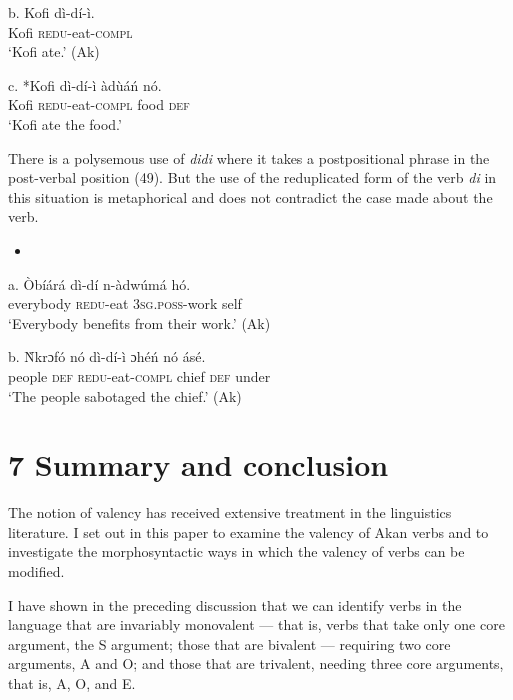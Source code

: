 \documentclass[output=paper]{langsci/langscibook}
\begin{document}
\gll  b.  Kofi  d\`{i}-d\'{i}-\`{i}.\\
       Kofi  \textsc{redu}{}-eat-\textsc{compl}\\
\glt   ‘Kofi ate.’ (Ak)
\z

\gll  c.  *Kofi  d\`{i}-d\'{i}-\`{i}      \`{a}d\`{u}\'{a}\'{n}    n\'{o}.\\
       Kofi  \textsc{redu}{}-eat-\textsc{compl}  food    \textsc{def}\\
\glt   ‘Kofi ate the food.’
\z

There is a polysemous use of \emph{didi} where it takes a postpositional phrase in the post-verbal position (49). But the use of the reduplicated form of the verb \emph{di} in this situation is metaphorical and does not contradict the case made about the verb.

\begin{itemize}
\item \end{itemize}
\gll a.  \`{O}b\'{i}\'{a}r\'{a}    d\`{i}-d\'{i}    n-\`{a}dw\'{u}m\'{a}    h\'{o}.\\
       everybody  \textsc{redu}{}-eat  \textsc{3sg.poss}{}-work  self\\
\glt   ‘Everybody benefits from their work.’ (Ak)
\z

\gll  b.  \`{N}krɔf\'{o}  n\'{o}  d\`{i}-d\'{i}-\`{i}      ɔh\'{e}\'{n}   n\'{o}  \'{a}s\'{e}.\\
       people  \textsc{def}  \textsc{redu}{}-eat-\textsc{compl}  chief  \textsc{def}  under\\
\glt   ‘The people sabotaged the chief.’ (Ak)
\z

\chapter[7  Summary and conclusion]{7  Summary and conclusion}

The notion of valency has received extensive treatment in the linguistics literature. I set out in this paper to examine the valency of Akan verbs and to investigate the morphosyntactic ways in which the valency of verbs can be modified. 

I have shown in the preceding discussion that we can identify verbs in the language that are invariably monovalent — that is, verbs that take only one core argument, the S argument; those that are bivalent — requiring two core arguments, A and O; and those that are trivalent, needing three core arguments, that is, A, O, and E.
\end{document}
